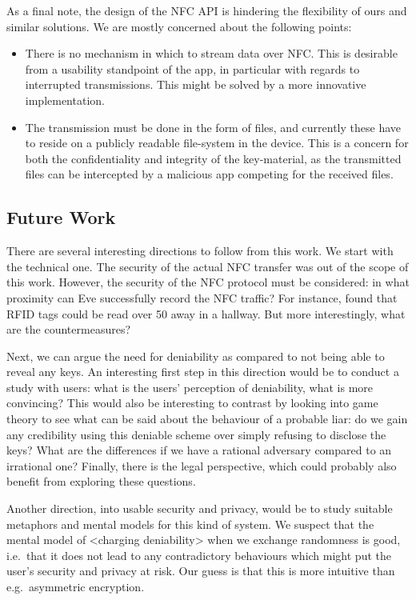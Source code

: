 As a final note, the design of the \ac{NFC} API is hindering the flexibility of 
ours and similar solutions.
We are mostly concerned about the following points:
\begin{itemize}
  \item There is no mechanism in which to stream data over \ac{NFC}\@.
    This is desirable from a usability standpoint of the app, in particular 
    with regards to interrupted transmissions.
    This might be solved by a more innovative implementation.
  \item The transmission must be done in the form of files, and currently these 
    have to reside on a publicly readable file-system in the device.
    This is a concern for both the confidentiality and integrity of the 
    key-material, as the transmitted files can be intercepted by a malicious 
    app competing for the received files.
\end{itemize}

\subsection{Future Work}

There are several interesting directions to follow from this work.
We start with the technical one.
The security of the actual \ac{NFC} transfer was out of the scope of this work.
However, the security of the \ac{NFC} protocol must be considered: in what 
proximity can Eve successfully record the \ac{NFC} traffic?
For instance, \citet{RFIDProximity} found that RFID tags could be read over 
\unit{50}{\metre} away in a hallway.
But more interestingly, what are the countermeasures?

Next, we can argue the need for deniability as compared to not being able to 
reveal any keys.
An interesting first step in this direction would be to conduct a study with 
users: what is the users' perception of deniability, what is more convincing?
This would also be interesting to contrast by looking into game theory to see 
what can be said about the behaviour of a probable liar: do we gain any 
credibility using this deniable scheme over simply refusing to disclose the 
keys?
What are the differences if we have a rational adversary compared to an 
irrational one?
Finally, there is the legal perspective, which could probably also benefit from 
exploring these questions.

Another direction, into usable security and privacy, would be to study suitable 
metaphors and mental models for this kind of system.
We suspect that the mental model of <charging deniability> when we exchange 
randomness is good, i.e.~that it does not lead to any contradictory behaviours 
which might put the user's security and privacy at risk.
Our guess is that this is more intuitive than e.g.~asymmetric encryption.

